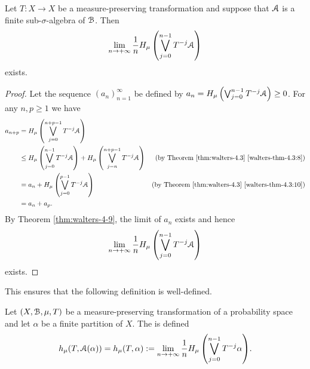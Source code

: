 \begin{corollary} \label{cor:walters-4-9-1}
	Let $T : X \to X$ be a measure-preserving transformation and suppose that $\mathcal{A}$ is a finite sub-$\sigma$-algebra of $\mathcal{B}$. Then
	\[
		\lim_{n \to +\infty}{\frac{1}{n} H_\mu\left(\bigvee_{j = 0}^{n - 1}{T^{-j}{\mathcal{A}}}\right)}
	\]
	exists.
	\begin{proof}
		Let the sequence $(a_n)_{n = 1}^\infty$ be defined by $a_n = H_\mu\left(\bigvee_{j = 0}^{n - 1}{T^{-j}{\mathcal{A}}}\right) \geq 0$. For any $n, p \geq 1$ we have
		\begin{align*}
			a_{n + p} &= H_\mu\left(\bigvee_{j = 0}^{n + p - 1}{T^{-j}{\mathcal{A}}}\right) \\
				&\leq H_\mu\left(\bigvee_{j = 0}^{n - 1}{T^{-j}{\mathcal{A}}}\right) + H_\mu\left(\bigvee_{j = n}^{n + p - 1}{T^{-j}{\mathcal{A}}}\right) & \text{(by Theorem \ref{thm:walters-4.3} \ref{walters-thm-4.3:8})} \\
				&= a_n + H_\mu\left(\bigvee_{j = 0}^{p - 1}{T^{-j}{\mathcal{A}}}\right) & \text{(by Theorem \ref{thm:walters-4.3} \ref{walters-thm-4.3:10})} \\
				&= a_n + a_p.
		\end{align*}
		By Theorem \ref{thm:walters-4-9}, the limit of $a_n$ exists and hence
		\[
			\lim_{n \to +\infty}{\frac{1}{n} H_\mu\left(\bigvee_{j = 0}^{n - 1}{T^{-j}{\mathcal{A}}}\right)}
		\]
		exists.
	\end{proof}
\end{corollary}

This ensures that the following definition is well-defined.

\begin{definition}
	Let $(X, \mathcal{B}, \mu, T)$ be a measure-preserving transformation of a probability space and let $\alpha$ be a finite partition of $X$. The  is defined
	\[
		h_\mu(T, \mathcal{A}(\alpha)) = h_\mu(T, \alpha) := \lim_{n \to +\infty}{\frac{1}{n} H_\mu\left(\bigvee_{j = 0}^{n - 1}{}T^{-j}{\alpha}\right)}.
	\]
\end{definition}

